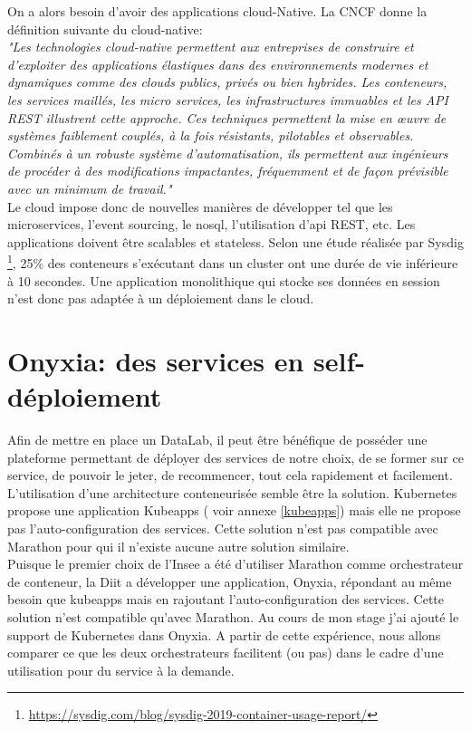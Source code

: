 \documentclass[11pt,fleqn]{book} %
\begin{document}
On a alors besoin d'avoir des applications cloud-Native. La CNCF donne la définition suivante du cloud-native: \\

\textit{"Les technologies cloud-native permettent aux entreprises de construire et d'exploiter des applications élastiques dans des environnements modernes et dynamiques comme des clouds publics, privés ou bien hybrides. Les conteneurs, les services maillés, les micro services, les infrastructures immuables et les API REST illustrent cette approche. Ces techniques permettent la mise en œuvre de systèmes faiblement couplés, à la fois résistants, pilotables et observables. Combinés à un robuste système d'automatisation, ils permettent aux ingénieurs de procéder à des modifications impactantes, fréquemment et de façon prévisible avec un minimum de travail."} \\

Le cloud impose donc de nouvelles manières de développer tel que les microservices, l'event sourcing, le nosql, l'utilisation d'api REST, etc. Les applications doivent être scalables et stateless. Selon une étude réalisée par Sysdig \footnote{\url{https://sysdig.com/blog/sysdig-2019-container-usage-report/}}, 25\% des conteneurs s'exécutant dans un cluster ont une durée de vie inférieure à 10 secondes. Une application monolithique qui stocke ses données en session n'est donc pas adaptée à un déploiement dans le cloud.  \\



\chapter{Onyxia: des services en self-déploiement}
\vspace{-2cm}
Afin de mettre en place un DataLab, il peut être bénéfique de posséder une plateforme permettant de déployer des services de notre choix, de se former sur ce service, de pouvoir le jeter, de recommencer, tout cela rapidement et facilement. L'utilisation d'une architecture conteneurisée semble être la solution. Kubernetes propose une application Kubeapps ( voir annexe \ref{kubeapps}) mais elle ne propose pas l'auto-configuration des services. Cette solution n'est pas compatible avec Marathon pour qui il n'existe aucune autre solution similaire.\\

Puisque le premier choix de l'Insee a été d'utiliser Marathon comme orchestrateur de conteneur, la Diit a développer une application, Onyxia, répondant au même besoin que kubeapps mais en rajoutant l'auto-configuration des services. Cette solution n'est  compatible qu'avec Marathon. Au cours de mon stage j'ai ajouté le support de Kubernetes dans Onyxia. A partir de cette expérience, nous allons comparer ce que les deux orchestrateurs facilitent (ou pas) dans le cadre d'une utilisation pour du service à la demande.
\end{document}
